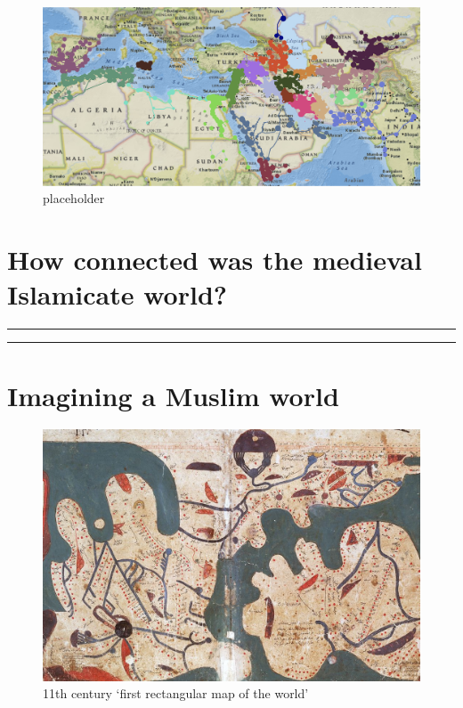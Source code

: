 \documentclass[
]{book}
\begin{document}
\begin{figure}
\centering
\includegraphics{./files/map3.png}
\caption{placeholder}
\end{figure}

\hypertarget{how-connected-was-the-medieval-islamicate-world}{%
\section{How connected was the medieval Islamicate world?}\label{how-connected-was-the-medieval-islamicate-world}}

\begin{center}\rule{0.5\linewidth}{0.5pt}\end{center}

\begin{center}\rule{0.5\linewidth}{0.5pt}\end{center}

\hypertarget{imagining-a-muslim-world}{%
\section{Imagining a Muslim world}\label{imagining-a-muslim-world}}

\begin{figure}
\centering
\includegraphics{./files/rectangularmap.jpeg}
\caption{11th century `first rectangular map of the world'}
\end{figure}
\end{document}
